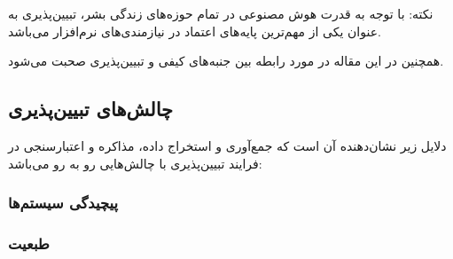 نکته: با توجه به قدرت هوش مصنوعی در تمام حوزه‌های زندگی بشر، تبیین‌پذیری به
عنوان یکی از مهم‌ترین پایه‌های اعتماد در نیازمندی‌های نرم‌افزار می‌باشد.


همچنین در این مقاله در مورد رابطه بین جنبه‌های کیفی و تبیین‌پذیری صحبت می‌شود.

\subsection{چالش‌های تبیین‌پذیری}

دلایل زیر نشان‌دهنده آن است که جمع‌آوری و استخراج داده، مذاکره و اعتبارسنجی در
فرایند تبیین‌پذیری با چالش‌هایی رو به رو می‌باشد:

\subsubsection{پیچیدگی سیستم‌ها}

\subsubsection{طبعیت }